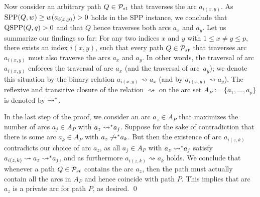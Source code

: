 \documentclass[11pt,fleqn]{article}
\begin{document}
Now consider an arbitrary path $Q\in{\cal P}_{st}$ that traverses the arc $a_{i(x,y)}$.
As $\text{SPP}(Q,w)\ge w(a_{i(x,y)})>0$ holds in the SPP instance, we conclude that $\text{QSPP}(Q,q)>0$ and 
that $Q$ hence traverses both arcs $a_x$ and $a_y$.
Let us summarize our findings so far:
For any two indices $x$ and $y$ with $1\le x\ne y\le p$, there exists an index $i(x,y)$,
such that every path $Q\in{\cal P}_{st}$ that traverses arc $a_{i(x,y)}$ must also traverse the 
arcs $a_x$ and $a_y$.
In other words, the traversal of arc $a_{i(x,y)}$ enforces the traversal of arc $a_x$ 
(and the traversal of arc~$a_y$); we denote this situation by the binary relation 
$a_{i(x,y)}\rightsquigarrow a_x$ (and by $a_{i(x,y)}\rightsquigarrow a_y$).
The reflexive and transitive closure of the relation $\rightsquigarrow$ on the 
arc set $A_P:=\{a_1,\ldots,a_p\}$ is denoted by $\rightsquigarrow\negthickspace^*$.

In the last step of the proof, we consider an arc $a_z\in A_P$ that maximizes the number 
of arcs $a_j\in A_P$ with $a_z\rightsquigarrow\negthickspace^* a_j$.
Suppose for the sake of contradiction that there is some arc $a_k\in A_P$ 
with $a_z\not\rightsquigarrow\negthickspace^* a_k$.
But then the existence of arc $a_{i(z,k)}$ contradicts our choice of arc $a_z$, 
as all $a_j\in A_P$ with $a_z\rightsquigarrow\negthickspace^* a_j$ 
satisfy $a_{i(z,k)}\rightsquigarrow a_z\rightsquigarrow\negthickspace^* a_j$,
and as furthermore $a_{i(z,k)}\rightsquigarrow a_k$ holds.
We conclude that whenever a path $Q\in{\cal P}_{st}$ contains the arc $a_z$, then the path
must actually contain all the arcs in $A_P$ and hence coincide with path $P$.
This implies that arc $a_z$ is a private arc for path $P$, as desired.
\qed
\end{document}
